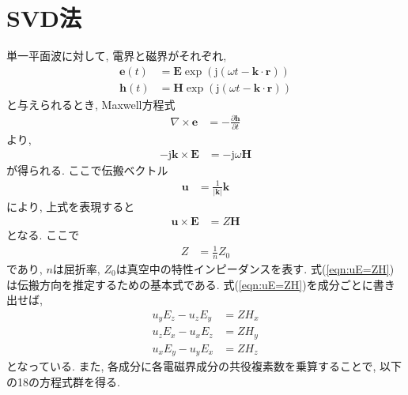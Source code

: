 \documentclass[a4j]{jsarticle}
\begin{document}
\section{SVD法}
単一平面波に対して, 電界と磁界がそれぞれ, 
\begin{align}
\bm{e}(t)&=\bm{E}\exp \left( \mathrm{j}(\omega t-\bm{k}\cdot \bm{r})\right) \\
\bm{h}(t)&=\bm{H}\exp \left( \mathrm{j}(\omega t-\bm{k}\cdot \bm{r})\right) 
\end{align}
と与えられるとき, Maxwell方程式
\begin{align}
\nabla \times \bm{e}&=-\frac{\partial \bm{h}}{\partial t}
\end{align}
より, 
\begin{align}
-\mathrm{j}\bm{k}\times \bm{E}&=-\mathrm{j}\omega \bm{H}
\end{align}
が得られる. ここで伝搬ベクトル
\begin{align}
\bm{u}&=\frac{1}{|\bm{k}|}\bm{k}
\end{align}
により, 上式を表現すると
\begin{align}
\bm{u}\times \bm{E}&=Z\bm{H}\label{eqn:uE=ZH}
\end{align}
となる. ここで
\begin{align}
Z&=\frac{1}{n}Z_{0}
\end{align}
であり, $n$は屈折率, $Z_{0}$は真空中の特性インピーダンスを表す. 
式(\ref{eqn:uE=ZH})は伝搬方向を推定するための基本式である. 
式(\ref{eqn:uE=ZH})を成分ごとに書き出せば, 
\begin{align}
u_{y}E_{z}-u_{z}E_{y}&=ZH_{x}\nonumber\\
u_{z}E_{x}-u_{x}E_{z}&=ZH_{y}\nonumber\\
u_{x}E_{y}-u_{y}E_{x}&=ZH_{z}
\end{align}
となっている. また, 各成分に各電磁界成分の共役複素数を乗算することで, 以下の18の方程式群を得る. 
\end{document}
